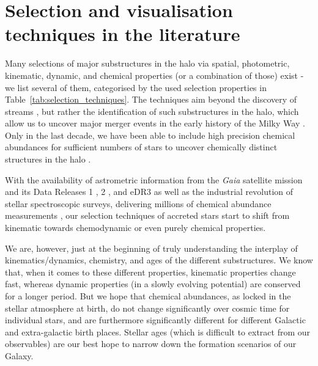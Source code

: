 \documentclass[fleqn,usenatbib]{mnras}
\newcommand{\Gaia}{\textit{Gaia}\xspace} %
\begin{document}


\appendix

\section{Selection and visualisation techniques in the literature} \label{sec:selection_techniques}


Many selections of major substructures in the halo via spatial, photometric, kinematic, dynamic, and chemical properties (or a combination of those) exist - we list several of them, categorised by the used selection properties in Table~\ref{tab:selection_techniques}. The techniques aim beyond the discovery of streams \citep[e.g.][]{Helmi1999,Grillmair2006,Belokurov2006}, but rather the identification of such substructures in the halo, which allow us to uncover major merger events in the early history of the Milky Way \citep[see][for a review see]{Helmi2020}. Only in the last decade, we have been able to include high precision chemical abundances \cite[for a review see][]{Nissen2018} for sufficient numbers of stars to uncover chemically distinct structures in the halo \citet[e.g.][]{Nissen2010, Nissen2011}. 

With the availability of astrometric information from the \Gaia satellite mission and its Data Releases 1 \citep{Brown2016}, 2 \cite{Brown2018}, and eDR3 \citep{Brown2021} as well as the industrial revolution of stellar spectroscopic surveys, delivering millions of chemical abundance measurements \cite[for a review see][]{Jofre2019}, our selection techniques of accreted stars start to shift from kinematic towards chemodynamic or even purely chemical properties.

We are, however, just at the beginning of truly understanding the interplay of kinematics/dynamics, chemistry, and ages of the different substructures. We know that, when it comes to these different properties, kinematic properties change fast, whereas dynamic properties (in a slowly evolving potential) are conserved for a longer period. But we hope that chemical abundances, as locked in the stellar atmosphere at birth, do not change significantly over cosmic time for individual stars, and are furthermore significantly different for different Galactic and extra-galactic birth places. Stellar ages (which is difficult to extract from our observables) are our best hope to narrow down the formation scenarios of our Galaxy.
\end{document}
